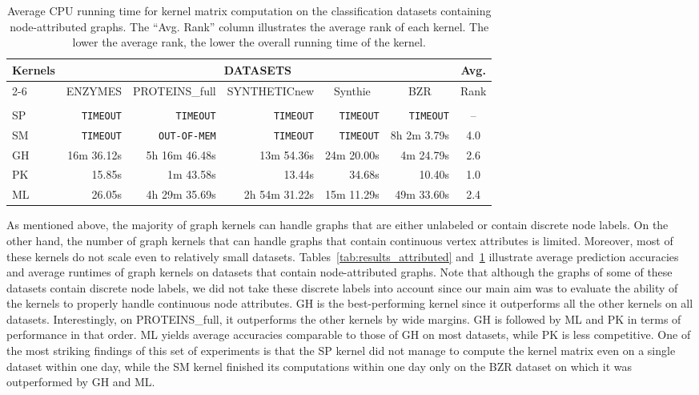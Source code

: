 \documentclass[twoside,11pt]{article}
\begin{document}
\begin{table}[t]
\centering
\scriptsize
\begin{sc}
\def\arraystretch{1.1}
\begin{tabular}{lrrrrrc} \hline
\multirow{3}{*}{Kernels} & \multicolumn{5}{c}{DATASETS} & \multirow{2}{*}{Avg.} \\ \cline{2-6}
& \multicolumn{1}{c}{\multirow{2}{*}{ENZYMES}} & \multicolumn{1}{c}{\multirow{2}{*}{PROTEINS\_full}} & \multicolumn{1}{c}{\multirow{2}{*}{SYNTHETICnew}} & \multicolumn{1}{c}{\multirow{2}{*}{Synthie}} & \multicolumn{1}{c}{\multirow{2}{*}{BZR}} & \multirow{2}{*}{Rank} \\ 
& & & & & \\ \hline
SP & \texttt{TIMEOUT} & \texttt{TIMEOUT} & \texttt{TIMEOUT} & \texttt{TIMEOUT} & \texttt{TIMEOUT} & -- \\
SM & \texttt{TIMEOUT} & \texttt{OUT-OF-MEM} & \texttt{TIMEOUT} & \texttt{TIMEOUT} & 8h 2m 3.79s & 4.0 \\
GH & 16m 36.12s & 5h 16m 46.48s & 13m 54.36s & 24m 20.00s & 4m 24.79s & 2.6 \\
PK & 15.85s & 1m 43.58s & 13.44s & 34.68s & 10.40s & 1.0 \\
ML & 26.05s & 4h 29m 35.69s & 2h 54m 31.22s & 15m 11.29s & 49m 33.60s & 2.4 \\ \hline
\end{tabular}
\end{sc}
\caption{Average CPU running time for kernel matrix computation on the  classification datasets containing node-attributed graphs. The ``Avg. Rank'' column illustrates the average rank of each kernel. The lower the average rank, the lower the overall running time of the kernel.}
\label{tab:runtimes_attributed}
\end{table}

As mentioned above, the majority of graph kernels can handle graphs that are either unlabeled or contain discrete node labels.
On the other hand, the number of graph kernels that can handle graphs that contain continuous vertex attributes is limited.
Moreover, most of these kernels do not scale even to relatively small datasets.
Tables~\ref{tab:results_attributed} and~\ref{tab:runtimes_attributed} illustrate average prediction accuracies and average runtimes of  graph kernels on datasets that contain node-attributed graphs.
Note that although the graphs of some of these datasets contain discrete node labels, we did not take these discrete labels into account since our main aim was to evaluate the ability of the kernels to properly handle continuous node attributes.
GH is the best-performing kernel since it outperforms all the other kernels on all datasets.
Interestingly, on PROTEINS\_full, it outperforms the other kernels by wide margins.
GH is followed by ML and PK in terms of performance in that order.
ML yields average accuracies comparable to those of GH on most datasets, while PK is less competitive.
One of the most striking findings of this set of experiments is that the SP kernel did not manage to compute the kernel matrix even on a single dataset within one day, while the SM kernel finished its computations within one day only on the BZR dataset on which it was outperformed by GH and ML.
\end{document}
